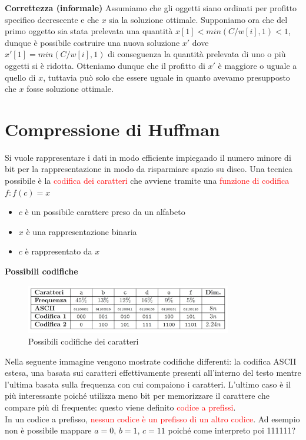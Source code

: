 \documentclass[../cheatSheetAlgoritmi.tex]{subfiles}
\begin{document}
\bigskip

\textbf{Correttezza (informale)}
Assumiamo che gli oggetti siano ordinati per profitto specifico decrescente e che $x$ sia la soluzione ottimale. Supponiamo ora che del primo oggetto sia stata prelevata una quantità $x[1] < min(C/w[i], 1) < 1$, dunque è possibile costruire una nuova soluzione $x'$ dove $x'[1] = min(C/w[i], 1)$ di conseguenza la quantità prelevata di uno o più oggetti si è ridotta. Otteniamo dunque che il profitto di $x'$ è maggiore o uguale a quello di $x$, tuttavia può solo che essere uguale in quanto avevamo presupposto che $x$ fosse soluzione ottimale.

\section{Compressione di Huffman}
Si vuole rappresentare i dati in modo efficiente impiegando il numero minore di bit per la rappresentazione in modo da risparmiare spazio su disco. Una tecnica possibile è la \textcolor{red}{codifica dei caratteri} che avviene tramite una \textcolor{red}{funzione di codifica} $f : f(c) = x$
\begin{itemize}
	\item $c$ è un possibile carattere preso da un alfabeto
	\item $x$ è una rappresentazione binaria
	\item $c$ è rappresentato da $x$
\end{itemize}
\textbf{Possibili codifiche}
\begin{figure}[h]
\centering
\includegraphics[width=0.8\textwidth]{../img/Greedy_1.jpg}
\caption{Possibili codifiche dei caratteri}
\end{figure}

Nella seguente immagine vengono mostrate codifiche differenti: la codifica ASCII estesa, una basata sui caratteri effettivamente presenti all'interno del testo mentre l'ultima basata sulla frequenza con cui compaiono i caratteri. L'ultimo caso è il più interessante poiché utilizza meno bit per memorizzare il carattere che compare più di frequente: questo viene definito \textcolor{red}{codice a prefissi}.\\
In un codice a prefisso, \textcolor{red}{nessun codice è un prefisso di un altro codice}. Ad esempio non è possibile mappare $a = 0$, $b = 1$, $c = 11$ poiché come interpreto poi 111111?
 
\end{document}
